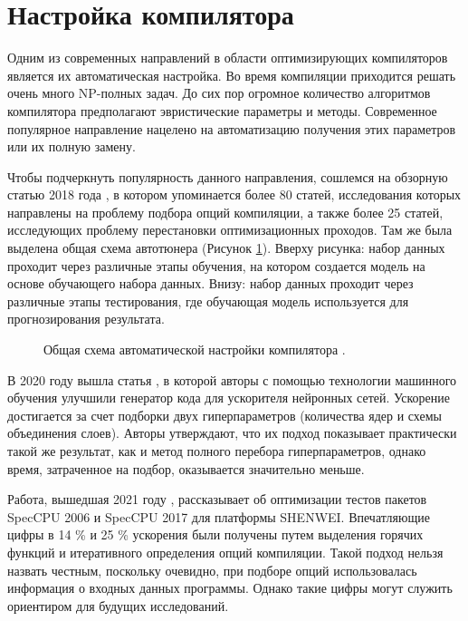  
\section{Настройка компилятора} \label{pr:tuning}

Одним из современных направлений в области оптимизирующих компиляторов является их автоматическая настройка. Во время компиляции приходится решать очень много NP-полных задач. До сих пор огромное количество алгоритмов компилятора предполагают эвристические параметры и методы. Современное популярное направление нацелено на автоматизацию получения этих параметров или их полную замену\cite{leather2020machine}.

Чтобы подчеркнуть популярность данного направления, сошлемся на обзорную статью 2018 года \cite{ashouri2018survey}, в котором упоминается более 80 статей, исследования которых направлены на проблему подбора опций компиляции, а также более 25 статей, исследующих проблему перестановки оптимизационных проходов. Там же была выделена общая схема автотюнера (Рисунок \ref{partReview:ml_for_comp1}). Вверху рисунка: набор данных проходит через различные этапы обучения, на котором создается модель на основе обучающего набора данных. Внизу: набор данных проходит через различные этапы тестирования, где обучающая модель используется для прогнозирования результата.  

 \begin{figure}[htbp]
	\centering
	
	\caption{Общая схема автоматической настройки компилятора \cite{ashouri2018survey}.}
	\label{partReview:ml_for_comp1}
\end{figure}

В 2020 году вышла статья \cite{liu2020dlfusion}, в которой авторы с помощью технологии машинного обучения улучшили генератор кода для ускорителя нейронных сетей. Ускорение достигается за счет подборки двух гиперпараметров (количества ядер и схемы объединения слоев). Авторы утверждают, что их подход показывает практически такой же результат, как и метод полного перебора гиперпараметров, однако время, затраченное на подбор, оказывается значительно меньше. 

Работа, вышедшая 2021 году \cite{wei2021compiler}, рассказывает об оптимизации тестов пакетов SpecCPU 2006 и SpecCPU 2017 для платформы SHENWEI. Впечатляющие цифры в 14 \% и 25 \% ускорения были получены путем выделения горячих функций и итеративного определения опций компиляции. Такой подход нельзя назвать честным, поскольку очевидно, при подборе опций использовалась информация о входных данных программы. Однако такие цифры могут служить ориентиром для будущих исследований. 

